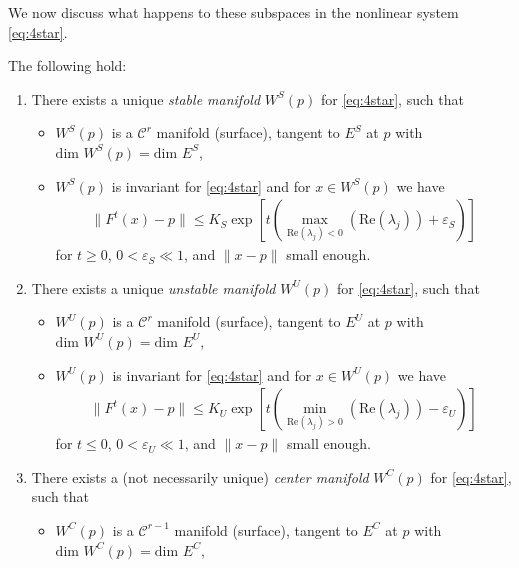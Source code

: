 We now discuss what happens to these subspaces in the nonlinear system \eqref{eq:4star}.
\begin{theorem} \label{thm:center_mfd}
	The following hold:
	\begin{enumerate}
		\item There exists a unique \emph{stable manifold} $W^{S}(p)$ for \eqref{eq:4star}, such that
	\begin{itemize}
		\item $W^{S}(p)$ is a $\mathcal{C}^{r}$ manifold (surface), tangent to $E^{S}$ at $p$ with $ \textrm{dim } W^{S}(p) =  \textrm{dim } E^{S}$,
		\item $W^{S}(p)$ is invariant for \eqref{eq:4star} and for $x\in W^{S}(p)$ we have 
			\begin{align}
				\| F^{t}(x)-p \| \leq K_{S} \exp\left[ t \left( \max_{ \textrm{Re} (\lambda_j) < 0}( \textrm{Re} (\lambda_j)) + \varepsilon_S \right) \right]
			\end{align}
	 for $t\geq 0$, $0 < \varepsilon_S \ll 1$, and  $\| x- p\|$ small enough.
	\end{itemize}
			
		\item There exists a unique \emph{unstable manifold} $W^{U}(p)$ for \eqref{eq:4star}, such that
	\begin{itemize}
		\item $W^{U}(p)$ is a $\mathcal{C}^{r}$ manifold (surface), tangent to $E^{U}$ at $p$ with $ \textrm{dim } W^{U}(p) =  \textrm{dim } E^{U}$,
		\item $W^{U}(p)$ is invariant for \eqref{eq:4star} and for $x\in W^{U}(p)$ we have 
			\begin{align}
				\| F^{t}(x) -p\| \leq K_{U} \exp\left[ t \left( \min_{ \textrm{Re} (\lambda_j) > 0}( \textrm{Re} (\lambda_j)) - \varepsilon_U \right) \right]
			\end{align}
	 for $t\leq 0$, $0 < \varepsilon_U \ll 1$, and  $\| x- p\|$ small enough.
	\end{itemize}
			
\item There exists a (not necessarily unique) \emph{center manifold} $W^{C}(p)$ for \eqref{eq:4star}, such that
	\begin{itemize}
		\item $W^{C}(p)$ is a $\mathcal{C}^{r-1}$ manifold (surface), tangent to $E^{C}$ at $p$ with $ \textrm{dim } W^{C}(p) =  \textrm{dim } E^{C}$,
	\end{itemize}
			
	\end{enumerate}
	
\end{theorem}
